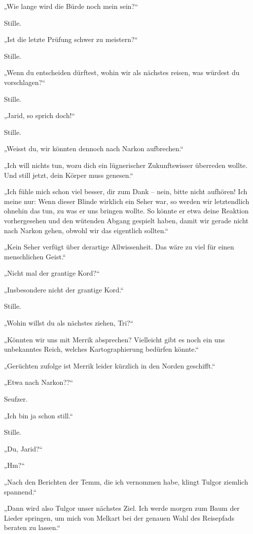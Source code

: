 „Wie lange wird die Bürde noch mein sein?“

Stille.

„Ist die letzte Prüfung schwer zu meistern?“

Stille.

„Wenn du entscheiden dürftest, wohin wir als nächstes reisen, was würdest du vorschlagen?“

Stille.

„Jarid, so sprich doch!“

Stille.

„Weisst du, wir könnten dennoch nach Narkon aufbrechen.“

„Ich will nichts tun, wozu dich ein lügnerischer Zukunftswisser überreden wollte. Und still jetzt, dein Körper muss genesen.“

„Ich fühle mich schon viel besser, dir zum Dank – nein, bitte nicht aufhören! Ich meine nur: Wenn dieser Blinde wirklich ein Seher war, so werden wir letztendlich ohnehin das tun, zu was er uns bringen wollte. So könnte er etwa deine Reaktion vorhergesehen und den wütenden Abgang gespielt haben, damit wir gerade nicht nach Narkon gehen, obwohl wir das eigentlich sollten.“

„Kein Seher verfügt über derartige Allwissenheit. Das wäre zu viel für einen menschlichen Geist.“

„Nicht mal der grantige Kord?“

„Insbesondere nicht der grantige Kord.“

Stille.

„Wohin willst du als nächstes ziehen, Tri?“

„Könnten wir uns mit Merrik absprechen? Vielleicht gibt es noch ein uns unbekanntes Reich, welches Kartographierung bedürfen könnte.“

„Gerüchten zufolge ist Merrik leider kürzlich in den Norden geschifft.“

„Etwa nach Narkon??“

Seufzer.

„Ich bin ja schon still.“

Stille.

„Du, Jarid?“

„Hm?“

„Nach den Berichten der Temm, die ich vernommen habe, klingt Tulgor ziemlich spannend.“

„Dann wird also Tulgor unser nächstes Ziel. Ich werde morgen zum Baum der Lieder springen, um mich von Melkart bei der genauen Wahl des Reisepfads beraten zu lassen.“

